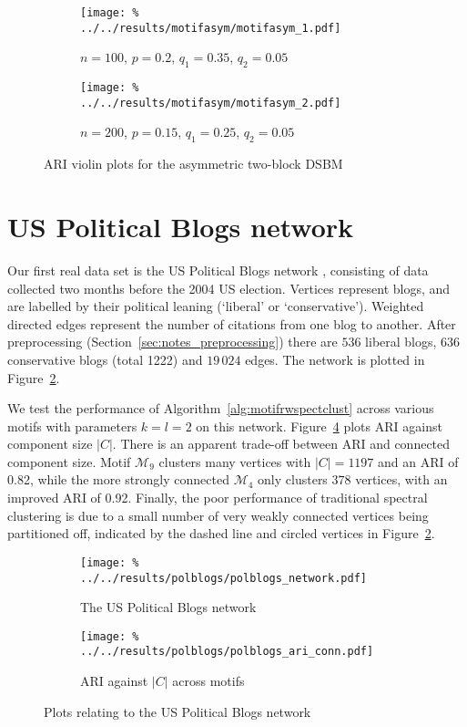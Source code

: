 \documentclass[12pt]{ociamthesis}
\theoremstyle{plain}
\theoremstyle{definition}
\theoremstyle{remark}
\newcommand\ca[1]{\mathcal{#1}}
\begin{document}
\begin{figure}[H]
\begin{subfigure}{.49\textwidth}
\centering
\texttt{[image: \%
../../results/motifasym/motifasym\_1.pdf]}
\caption{$n=100$, $p=0.2$, $q_1=0.35$, $q_2=0.05$}
\end{subfigure}
\begin{subfigure}{.49\textwidth}
\centering
\texttt{[image: \%
../../results/motifasym/motifasym\_2.pdf]}
\caption{$n=200$, $p=0.15$, $q_1=0.25$, $q_2=0.05$}
\end{subfigure}
\caption{ARI violin plots for the asymmetric two-block DSBM}
\label{fig:motifasym}
\end{figure}

\section{US Political Blogs network} \label{sec:motif_polblogs}

Our first real data set is the US Political Blogs network
\cite{adamic2005political}, consisting of data collected two months before the
2004 US election. Vertices represent blogs, and are labelled by their political
leaning (`liberal' or `conservative'). Weighted directed edges represent the
number of citations from one blog to another. After preprocessing
(Section~\ref{sec:notes_preprocessing}) there are $536$ liberal blogs, $636$
conservative blogs (total 1222) and $19 \, 024$ edges. The network is plotted
in Figure~\ref{fig:polblogs_network}.

We test the performance of Algorithm~\ref{alg:motifrwspectclust} across various
motifs with parameters $k=l=2$ on this network.
Figure~\ref{fig:polblogs_ariplot} plots ARI against component size $|C|$.
There is an apparent trade-off between ARI and connected component size.
Motif $\ca{M}_9$ clusters many vertices with $|C|=1197$ and an ARI of 0.82,
while the more strongly connected $\ca{M}_4$ only clusters $378$ vertices, with
an improved ARI of 0.92.
Finally, the poor performance of traditional spectral clustering is due to a
small number of very weakly connected vertices being partitioned off, indicated
by the dashed line and circled vertices in Figure~\ref{fig:polblogs_network}.

\vspace*{0.5cm}
\begin{figure}[H]
\begin{subfigure}{.49\textwidth}
\centering
\texttt{[image: \%
../../results/polblogs/polblogs\_network.pdf]}
\caption{The US Political Blogs network}
\label{fig:polblogs_network}
\end{subfigure}
\begin{subfigure}{.49\textwidth}
\centering
\texttt{[image: \%
../../results/polblogs/polblogs\_ari\_conn.pdf]}
\caption{ARI against $|C|$ across motifs}
\label{fig:polblogs_ariplot}
\end{subfigure}
\caption{Plots relating to the US Political Blogs network}
\end{figure}
\end{document}
